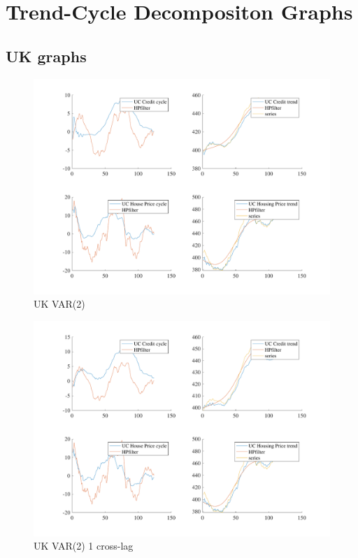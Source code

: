 \documentclass[
  12pt,
]{article}
\begin{document}
\clearpage

\hypertarget{trend-cycle-decompositon-graphs}{%
\section{Trend-Cycle Decompositon Graphs}\label{trend-cycle-decompositon-graphs}}

\hypertarget{uk-graphs}{%
\subsection{UK graphs}\label{uk-graphs}}

\begin{figure}

{\centering \includegraphics[width=0.85\linewidth]{../../Regression/Bayesian_UC_VAR2_nodrift/OutputData/cycles_GB} 

}

\caption{UK VAR(2)}\label{fig:unnamed-chunk-3}
\end{figure}

\begin{figure}

{\centering \includegraphics[width=0.85\linewidth]{../../Regression/Bayesian_UC_VAR2_nodrift_Crosscycle1lag/OutputData/cycles_GB} 

}

\caption{UK VAR(2) 1 cross-lag}\label{fig:unnamed-chunk-4}
\end{figure}
\end{document}
